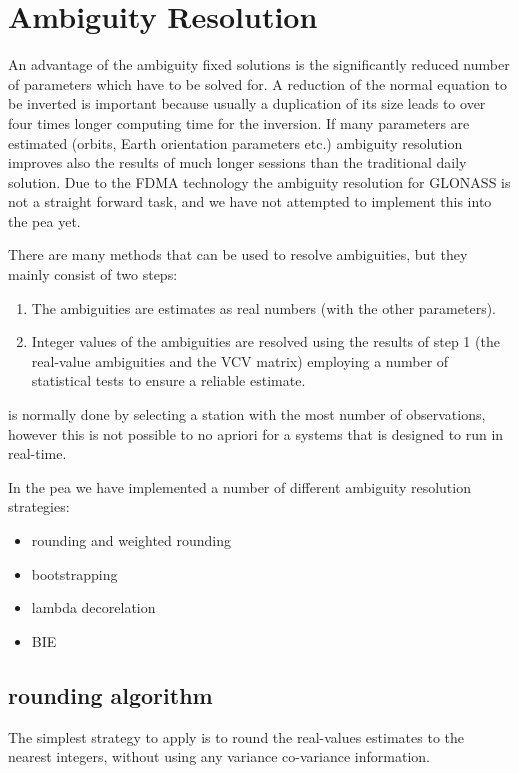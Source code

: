 \chapter{Ambiguity Resolution}
\label{ch:Ambiguity Resolution}
\begin{fullwidth}
An advantage of the ambiguity fixed solutions is the significantly reduced number of parameters which have to be solved for. 
A reduction of the normal equation to be inverted is important because usually a duplication of its size leads to over four times longer computing time for the inversion. 
If many parameters are estimated (orbits, Earth orientation parameters etc.) ambiguity resolution improves also the results of much longer sessions than the traditional daily solution.  
Due to the FDMA technology the ambiguity resolution for GLONASS is not a straight forward task, and we have not attempted to implement this into the pea yet.
\end{fullwidth}
%
There are many methods that can be used to resolve ambiguities, but they mainly consist of two steps:
%
\begin{enumerate}
    \item The ambiguities are estimates as real numbers (with the other parameters).
    \item Integer values of the ambiguities are resolved using the results of step 1 (the real-value ambiguities and the VCV matrix) employing a number of statistical tests to ensure a reliable estimate.
\end{enumerate}
%
\begin{fullwidth}
 is normally done by selecting a station with the most number of observations, however this is not possible to no apriori for a systems that is designed to run in real-time.
\end{fullwidth}
%
In the pea we have implemented a number of different ambiguity resolution strategies:
\begin{itemize}
    \item rounding and weighted rounding
    \item bootstrapping
    \item lambda decorelation
    \item BIE
\end{itemize}
%
\section{rounding algorithm}
The simplest strategy to apply is to round the real-values estimates to the nearest integers, without using any variance co-variance information.
%

